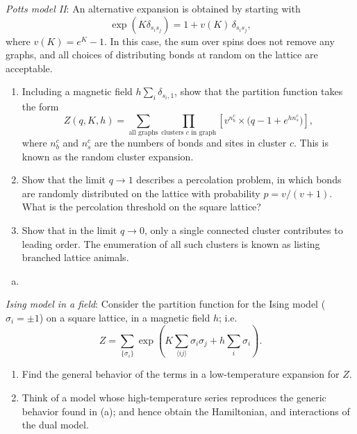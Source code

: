 \begin{problem}
    \textit{Potts model II}: An alternative expansion is obtained by starting with
    \[
        \exp(K\delta_{s_i s_j}) = 1 + v(K)\,\delta_{s_i s_j},
    \]
    where $v(K) = e^K - 1$. In this case, the sum over spins does not remove any graphs, and all choices of distributing bonds at random on the lattice are acceptable.

    \begin{enumerate}
        \item[(a)] Including a magnetic field $h\sum_i\delta_{s_i, 1}$, show that the partition function takes the form
        \[
            Z(q, K, h) = \sum_{\text{all graphs}}\prod_{\text{clusters } c \text{ in graph}}\left[v^{n_b^c}\times\bigl(q - 1 + e^{hn_s^c}\bigr)\right],
        \]
        where $n_b^c$ and $n_s^c$ are the numbers of bonds and sites in cluster $c$. This is known as the random cluster expansion.

        \item[(b)] Show that the limit $q \to 1$ describes a percolation problem, in which bonds are randomly distributed on the lattice with probability $p = v/(v+1)$. What is the percolation threshold on the square lattice?

        \item[(c)] Show that in the limit $q \to 0$, only a single connected cluster contributes to leading order. The enumeration of all such clusters is known as listing branched lattice animals.
    \end{enumerate}
\end{problem}

\begin{solution}
    \begin{enumerate}[(a)]
        \item
    \end{enumerate}
\end{solution}

\begin{problem}
    \textit{Ising model in a field}: Consider the partition function for the Ising model ($\sigma_i = \pm 1$) on a square lattice, in a magnetic field $h$; i.e.
    \[
        Z = \sum_{\{\sigma_i\}}\exp\!\left(K\sum_{\langle ij\rangle}\sigma_i\sigma_j + h\sum_i\sigma_i\right).
    \]

    \begin{enumerate}
        \item[(a)] Find the general behavior of the terms in a low-temperature expansion for $Z$.

        \item[(b)] Think of a model whose high-temperature series reproduces the generic behavior found in (a); and hence obtain the Hamiltonian, and interactions of the dual model.
    \end{enumerate}
\end{problem}

